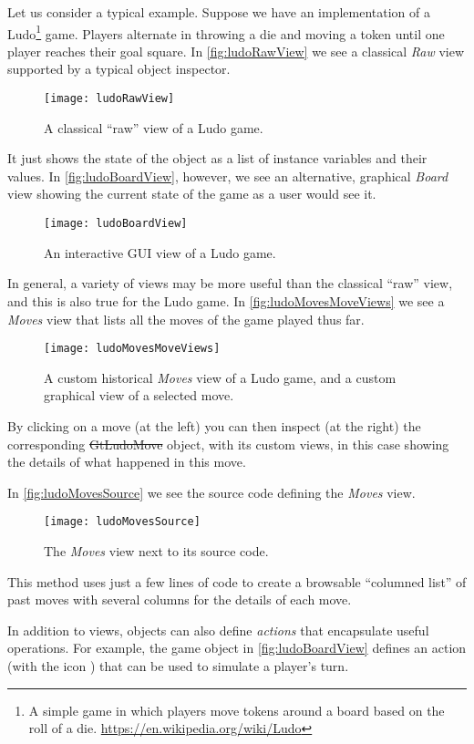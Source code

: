 \documentclass[sigplan,10pt]{acmart}
\newcommand*{\smallimg}[1]{%
    \raisebox{-.3\baselineskip}{%
        \texttt{[image: \#1]}%
    }%
}
\newcommand\ac[1]{\nbc{AC}{#1}{teal}}
\begin{document}
Let us consider a typical example.
Suppose we have an implementation of a Ludo\footnote{A simple game in which players move tokens around a board based on the roll of a die.
\url{https://en.wikipedia.org/wiki/Ludo}} game.
Players alternate in throwing a die and moving a token until one player reaches their goal square.
In \autoref{fig:ludoRawView} we see a classical \emph{Raw} view supported by a typical object inspector.
\begin{figure}[h]
  \texttt{[image: ludoRawView]}
  \caption{A classical ``raw'' view of a Ludo game.}
  \label{fig:ludoRawView}
\end{figure}
It just shows the state of the object as a list of instance variables and their values.
In \autoref{fig:ludoBoardView}, however, we see an alternative, graphical \emph{Board} view showing the current state of the game as a user would see it.
\begin{figure}[h]
  \texttt{[image: ludoBoardView]}
  \caption{An interactive GUI view of a Ludo game.}
  \label{fig:ludoBoardView}
\end{figure}

In general, a variety of views may be more useful than the classical ``raw'' view, and this is also true for the Ludo game.
In \autoref{fig:ludoMovesMoveViews} we see a \emph{Moves} view that lists all the moves of the game played thus far.
\begin{figure}[h]
  \texttt{[image: ludoMovesMoveViews]}
  \caption{A custom historical \emph{Moves} view of a Ludo game, and a custom graphical view of a selected move.}
  \label{fig:ludoMovesMoveViews}
\end{figure}
By clicking on a move (at the left) you can then inspect (at the right) the corresponding \st{GtLudoMove} object, with its custom views, in this case showing the details of what happened in this move.

In \autoref{fig:ludoMovesSource} we see the source code defining the \emph{Moves} view.
\begin{figure}[h]
  \texttt{[image: ludoMovesSource]}
  \caption{The \emph{Moves} view next to its source code.}
  \label{fig:ludoMovesSource}
\end{figure}
This method uses just a few lines of code to create a browsable ``columned list'' of past moves with several columns for the details of each move.

In addition to views, objects can also define \emph{actions} that encapsulate useful operations.
For example, the game object in \autoref{fig:ludoBoardView} defines an  action (with the icon \smallimg{ludoPlayActionIcon}) that can be used to simulate a player's turn.
\end{document}
